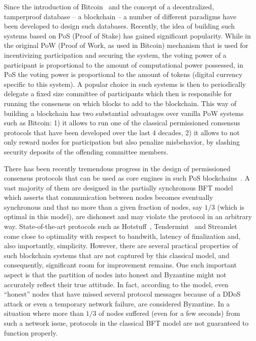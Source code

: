 \documentclass[12pt, fleqn]{article}
\begin{document}
Since the introduction of Bitcoin~\cite{nakamoto2008bitcoin} and the concept of a decentralized, tamperproof database -- a blockchain -- a number of different paradigms have been developed to design such databases.
%
Recently, the idea of building such systems based on PoS (Proof of Stake) has gained significant popularity.
%
While in the original PoW (Proof of Work, as used in Bitcoin) mechanism that is used for incentivizing participation and securing the system, the voting power of a participant is proportional to the amount of computational power possessed, in PoS the voting power is proportional to the amount of tokens (digital currency specific to this system).
%
A popular choice in such systems is then to periodically delegate a fixed size committee of participants which then is responsible for running the consensus on which blocks to add to the blockchain.
%
This way of building a blockchain has two substantial advantages over vanilla PoW systems such as Bitcoin: 1) it allows to run one of the classical permissioned consensus protocols that have been developed over the last 4 decades, 2) it allows to not only reward nodes for participation but also penalize misbehavior, by slashing security deposits of the offending committee members.
%

There has been recently tremendous progress in the design of permissioned consensus protocols that can be used as core engines in such PoS blockchains~\cite{AMNRY19,BKM18,BG17,CS20,GLSS19,GAGMPRSTT19,YMRGA19,zamfir2018casper}.
%
A vast majority of them are designed in the partially synchronous BFT model~\cite{DLS88} which asserts that communication between nodes becomes eventually synchronous and that no more than a given fraction of nodes, say $1/3$ (which is optimal in this model), are dishonest and may violate the protocol in an arbitrary way.
%
State-of-the-art protocols such as Hotstuff~\cite{YMRGA19}, Tendermint~\cite{BG17} and Streamlet~\cite{CS20} come close to optimality with respect to bandwith, latency of finalization and, also importantly, simplicity.
%
However, there are several practical properties of such blockchain systems that are not captured by this classical model, and consequently, significant room for improvement remains.
%
One such important aspect is that the partition of nodes into honest and Byzantine might not accurately reflect their true attitude.
%
In fact, according to the model, even ``honest'' nodes that have missed several protocol messages because of a DDoS attack or even a temporary network failure, are considered Byzantine.
%
In a situation where more than $1/3$ of nodes suffered (even for a few seconds) from such a network issue, protocols in the classical BFT model are not guaranteed to function properly.
\end{document}
